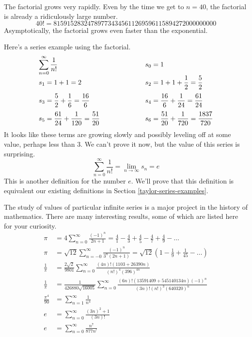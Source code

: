 \documentclass[fleqn]{report}
\begin{document}
The factorial grows very rapidly. Even by the time we get to
$n=40$, the factorial is already a ridiculously large number. 
\begin{equation*}
40! =815915283247897734345611269596115894272000000000
\end{equation*}
Asymptotically, the factorial grows even faster than the
exponential. 

\begin{example}
Here's a series example using the factorial.
\begin{displaymath}
\begin{array}{*2{>{\displaystyle}l}}
\sum_{n=0}^\infty \frac{1}{n!}
& \hspace{2cm} s_0 = 1 \\[1em]
s_1 = 1 + 1 = 2 
& \hspace{2cm} s_2 = 1 + 1 + \frac{1}{2} = \frac{5}{2} \\[1em]
s_3 = \frac{5}{2} + \frac{1}{6} = \frac{16}{6} 
& \hspace{2cm} s_4 = \frac{16}{6} + \frac{1}{24} =
\frac{61}{24} \\[1em]
s_5 = \frac{61}{24} + \frac{1}{120} = \frac{51}{20} 
& \hspace{2cm} s_6 = \frac{51}{20} + \frac{1}{720} = \frac{1837}{720} 
\end{array}
\end{displaymath}
It looks like these terms are growing slowly and possibly
leveling off at some value, perhaps less than 3. We can't
prove it now, but the value of this series is surprising.
\begin{equation*}
\sum_{n=0}^{\infty} \frac{1}{n!} = \lim_{n \rightarrow \infty}
s_n = e
\end{equation*}
This is another definition for the number $e$. We'll prove
that this definition is equivalent our existing definitions
in Section \ref{taylor-series-examples}.
\end{example}

\begin{example}
The study of values of particular infinite series is a major
project in the history of mathematics. There are many
interesting results, some of which are listed here for your
curiosity.
\begin{align*}
\pi & = 4 \sum_{n=0}^\infty \frac{(-1)^n}{2n+1} = 
\frac{4}{1} - \frac{4}{3} + \frac{4}{5} - \frac{4}{7} + 
\frac{4}{9} - \ldots \\
\pi & = \sqrt{12} \sum_{n=-0}^\infty \frac{(-1)^n}{3^n (2n+1)}
= \sqrt{12} \left( 1 - \frac{1}{9} + \frac{1}{45} - \ldots
\right) \\
\frac{1}{\pi} & = \frac{2\sqrt{2}}{9801} \sum_{n=0}^\infty
\frac{ (4n)! (1103 + 26390n)}{(n!)^4 (396)^{4n}} \\
\frac{1}{\pi} & = \frac{1}{426880 \sqrt{16005}}
\sum_{n=0}^\infty \frac{(6n)! (13591409 + 545140134n)
(-1)^n}{(3n)! (n!)^3 (640320)^n} \\
\frac{\pi^4}{90} & = \sum_{n=1}^\infty \frac{1}{n^4} \\
e & = \sum_{n=0}^\infty \frac{(3n)^2+1}{(3n)!} \\
e & = \sum_{n=0}^\infty \frac{n^7}{877n^!} 
\end{align*}
\end{example}
\end{document}
